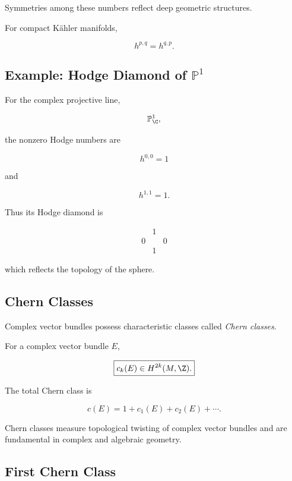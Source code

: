 Symmetries among these numbers reflect deep geometric structures.

For compact K\"ahler manifolds,

\[
\boxed{
h^{p,q}=h^{q,p}.
}
\]

\subsection{Example: Hodge Diamond of \(\mathbb{P}^1\)}
\label{subsec:hodge-diamond-p1}

For the complex projective line,

\[
\mathbb{P}^1_{\C},
\]

the nonzero Hodge numbers are

\[
h^{0,0}=1
\]

and

\[
h^{1,1}=1.
\]

Thus its Hodge diamond is

\[
\boxed{
\begin{array}{ccc}
&1&\\
0&&0\\
&1&
\end{array}
}
\]

which reflects the topology of the sphere.

\subsection{Chern Classes}
\label{subsec:chern-classes-complex}

Complex vector bundles possess characteristic classes called
\emph{Chern classes}.

For a complex vector bundle \(E\),

\[
\boxed{
c_k(E)\in H^{2k}(M,\Z).
}
\]

The total Chern class is

\[
\boxed{
c(E)
=
1+c_1(E)+c_2(E)+\cdots.
}
\]

Chern classes measure topological twisting of complex vector bundles and are
fundamental in complex and algebraic geometry.

\subsection{First Chern Class}
\label{subsec:first-chern-class}

